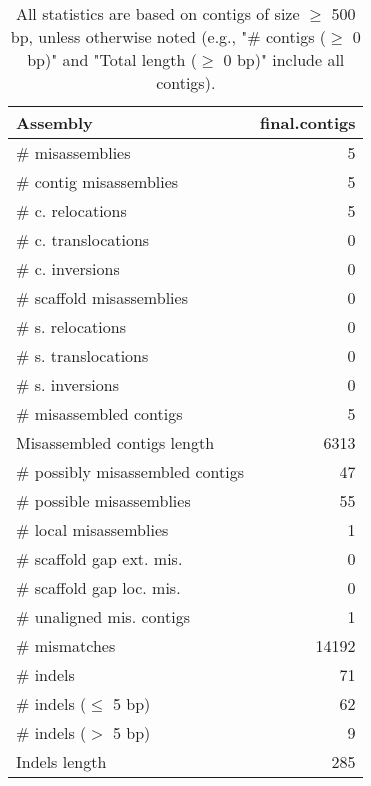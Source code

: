 \documentclass[12pt,a4paper]{article}
\begin{document}
\begin{table}[ht]
\begin{center}
\caption{All statistics are based on contigs of size $\geq$ 500 bp, unless otherwise noted (e.g., "\# contigs ($\geq$ 0 bp)" and "Total length ($\geq$ 0 bp)" include all contigs).}
\begin{tabular}{|l*{1}{|r}|}
\hline
Assembly & final.contigs \\ \hline
\# misassemblies & 5 \\ \hline
\hspace{2mm}\# contig misassemblies & 5 \\ \hline
\hspace{5mm}\# c. relocations & 5 \\ \hline
\hspace{5mm}\# c. translocations & 0 \\ \hline
\hspace{5mm}\# c. inversions & 0 \\ \hline
\hspace{2mm}\# scaffold misassemblies & 0 \\ \hline
\hspace{5mm}\# s. relocations & 0 \\ \hline
\hspace{5mm}\# s. translocations & 0 \\ \hline
\hspace{5mm}\# s. inversions & 0 \\ \hline
\# misassembled contigs & 5 \\ \hline
Misassembled contigs length & 6313 \\ \hline
\# possibly misassembled contigs & 47 \\ \hline
\hspace{5mm}\# possible misassemblies & 55 \\ \hline
\# local misassemblies & 1 \\ \hline
\# scaffold gap ext. mis. & 0 \\ \hline
\# scaffold gap loc. mis. & 0 \\ \hline
\# unaligned mis. contigs & 1 \\ \hline
\# mismatches & 14192 \\ \hline
\# indels & 71 \\ \hline
\hspace{5mm}\# indels ($\leq$ 5 bp) & 62 \\ \hline
\hspace{5mm}\# indels ($>$ 5 bp) & 9 \\ \hline
Indels length & 285 \\ \hline
\end{tabular}
\end{center}
\end{table}
\end{document}

